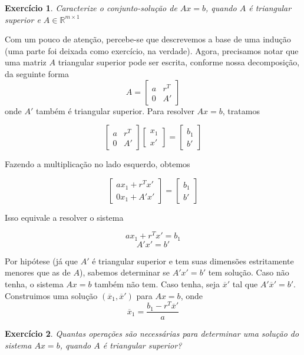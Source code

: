 \documentclass[]{article}
\newtheorem{exercicio}{Exercício}
\numberwithin{equation}{section}
\begin{document}
\begin{exercicio}
	Caracterize o conjunto-solução de $Ax = b$, quando $A$ é triangular superior e $A \in \mathbb{R}^{m \times 1}$
\end{exercicio}

Com um pouco de atenção, percebe-se que descrevemos a base de uma indução (uma parte foi deixada como exercício, na verdade). Agora, precisamos notar que uma matriz $A$ triangular superior pode ser escrita, conforme nossa decomposição, da seguinte forma
$$
A =
\begin{bmatrix}
a & r^T \\
0 & A'
\end{bmatrix}
$$
onde $A'$ também é triangular superior. Para resolver $Ax = b$, tratamos

$$
\begin{bmatrix}
a & r^T \\
0 & A'
\end{bmatrix}
\begin{bmatrix}
x_1 \\
x'
\end{bmatrix}
=
\begin{bmatrix}
b_1 \\
b'
\end{bmatrix}
$$

Fazendo a multiplicação no lado esquerdo, obtemos

$$
\begin{bmatrix}
ax_1 + r^Tx' \\
0x_1 + A'x'
\end{bmatrix}
=
\begin{bmatrix}
b_1 \\
b'
\end{bmatrix}
$$

Isso equivale a resolver o sistema

$$
ax_1 + r^Tx' = b_1
$$
$$
A'x' = b'
$$

Por hipótese (já que $A'$ é triangular superior e tem suas dimensões estritamente menores que as de $A$), sabemos determinar se $A'x' = b'$ tem solução. Caso não tenha, o sistema $Ax = b$ também não tem. Caso tenha, seja $\overline{x}'$ tal que $A'\overline{x}' = b'$. Construimos uma solução $(\overline{x}_1, \overline{x}')$ para $Ax = b$, onde
$$
\overline{x}_1 = \frac{b_1 - r^T\overline{x}'}{a}
$$

\begin{exercicio}
	Quantas operações são necessárias para determinar uma solução do sistema $Ax = b$, quando $A$ é triangular superior?
\end{exercicio}
\end{document}
